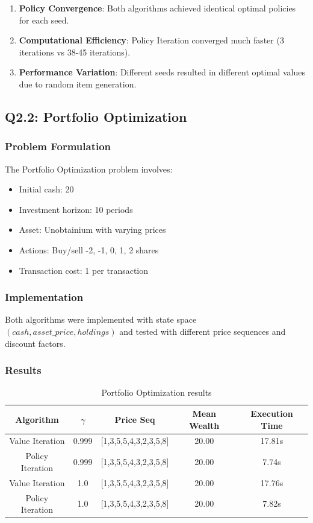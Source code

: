 \documentclass[12pt]{article}
\begin{document}
\begin{enumerate}
    \item \textbf{Policy Convergence}: Both algorithms achieved identical optimal policies for each seed.
    
    \item \textbf{Computational Efficiency}: Policy Iteration converged much faster (3 iterations vs 38-45 iterations).
    
    \item \textbf{Performance Variation}: Different seeds resulted in different optimal values due to random item generation.
\end{enumerate}

\subsection{Q2.2: Portfolio Optimization}

\subsubsection{Problem Formulation}

The Portfolio Optimization problem involves:
\begin{itemize}
    \item Initial cash: 20
    \item Investment horizon: 10 periods
    \item Asset: Unobtainium with varying prices
    \item Actions: Buy/sell {-2, -1, 0, 1, 2} shares
    \item Transaction cost: 1 per transaction
\end{itemize}

\subsubsection{Implementation}

Both algorithms were implemented with state space $(cash, asset\_price, holdings)$ and tested with different price sequences and discount factors.

\subsubsection{Results}

\begin{table}[H]
\centering
\begin{tabular}{|c|c|c|c|c|}
\hline
Algorithm & $\gamma$ & Price Seq & Mean Wealth & Execution Time \\
\hline
Value Iteration & 0.999 & [1,3,5,5,4,3,2,3,5,8] & 20.00 & 17.81s \\
Policy Iteration & 0.999 & [1,3,5,5,4,3,2,3,5,8] & 20.00 & 7.74s \\
Value Iteration & 1.0 & [1,3,5,5,4,3,2,3,5,8] & 20.00 & 17.76s \\
Policy Iteration & 1.0 & [1,3,5,5,4,3,2,3,5,8] & 20.00 & 7.82s \\
\hline
\end{tabular}
\caption{Portfolio Optimization results}
\end{table}
\end{document}
